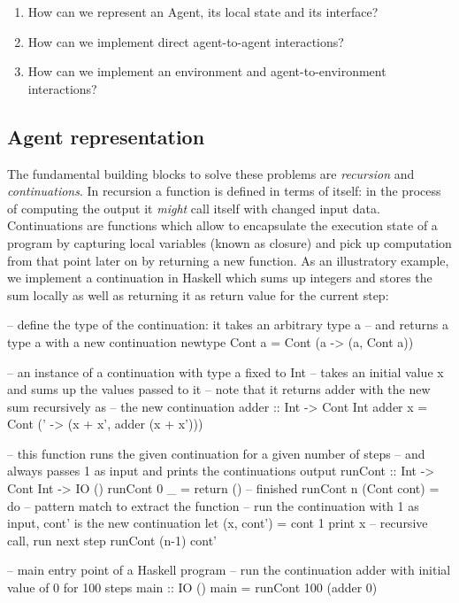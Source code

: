 \begin{enumerate}
	\item How can we represent an Agent, its local state and its interface?
	\item How can we implement direct agent-to-agent interactions?
	\item How can we implement an environment and agent-to-environment interactions? 
\end{enumerate}

\subsection{Agent representation}
The fundamental building blocks to solve these problems are \textit{recursion} and \textit{continuations}. In recursion a function is defined in terms of itself: in the process of computing the output it \textit{might} call itself with changed input data. Continuations are functions which allow to encapsulate the execution state of a program by capturing local variables (known as closure) and pick up computation from that point later on by returning a new function. As an illustratory example, we implement a continuation in Haskell which sums up integers and stores the sum locally as well as returning it as return value for the current step:

\begin{HaskellCode}
-- define the type of the continuation: it takes an arbitrary type a 
-- and returns a type a with a new continuation
newtype Cont a = Cont (a -> (a, Cont a))

-- an instance of a continuation with type a fixed to Int
-- takes an initial value x and sums up the values passed to it
-- note that it returns adder with the new sum recursively as 
-- the new continuation
adder :: Int -> Cont Int
adder x = Cont (\x' -> (x + x', adder (x + x')))

-- this function runs the given continuation for a given number of steps
-- and always passes 1 as input and prints the continuations output
runCont :: Int -> Cont Int -> IO ()
runCont 0 _ = return () -- finished
runCont n (Cont cont) = do -- pattern match to extract the function
  -- run the continuation with 1 as input, cont' is the new continuation
  let (x, cont') = cont 1
  print x
  -- recursive call, run next step
  runCont (n-1) cont'

-- main entry point of a Haskell program
-- run the continuation adder with initial value of 0 for 100 steps 
main :: IO ()
main = runCont 100 (adder 0)
\end{HaskellCode}

